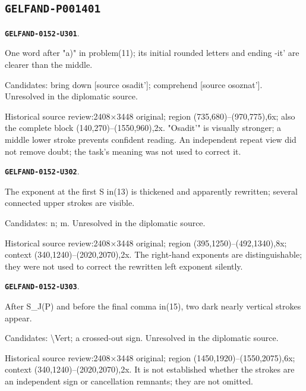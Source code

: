 \documentclass[11pt]{article}
\theoremstyle{definition}
\theoremstyle{remark}
\begin{document}
\subsection*{\texttt{GELFAND-P001401}}
\par\noindent\leavevmode{}\label{GELFAND-0152-U301}\label{GELFAND-P001401:task-a:note}\textbf{\texttt{GELFAND-0152-U301}}.\nopagebreak[4]\par
One word after "a)" in problem(11); its initial rounded letters and ending -it' are clearer than the middle.\par
Candidates: bring down [source osadit']; comprehend [source osoznat']. Unresolved in the diplomatic source.\par
Historical source review:2408×3448 original; region (735,680)–(970,775),6x; also the complete block (140,270)–(1550,960),2x. "Osadit'" is visually stronger; a middle lower stroke prevents confident reading. An independent repeat view did not remove doubt; the task's meaning was not used to correct it.\par\medskip
\par\noindent\leavevmode{}\label{GELFAND-0152-U302}\label{GELFAND-P001401:formula-13-power:note}\textbf{\texttt{GELFAND-0152-U302}}.\nopagebreak[4]\par
The exponent at the first S in(13) is thickened and apparently rewritten; several connected upper strokes are visible.\par
Candidates: n; m. Unresolved in the diplomatic source.\par
Historical source review:2408×3448 original; region (395,1250)–(492,1340),8x; context (340,1240)–(2020,2070),2x. The right-hand exponents are distinguishable; they were not used to correct the rewritten left exponent silently.\par\medskip
\par\noindent\leavevmode{}\label{GELFAND-0152-U303}\label{GELFAND-P001401:formula-15-end:note}\textbf{\texttt{GELFAND-0152-U303}}.\nopagebreak[4]\par
After S\_J(P) and before the final comma in(15), two dark nearly vertical strokes appear.\par
Candidates: \textbackslash{}Vert; a crossed-out sign. Unresolved in the diplomatic source.\par
Historical source review:2408×3448 original; region (1450,1920)–(1550,2075),6x; context (340,1240)–(2020,2070),2x. It is not established whether the strokes are an independent sign or cancellation remnants; they are not omitted.\par\medskip
\end{document}
